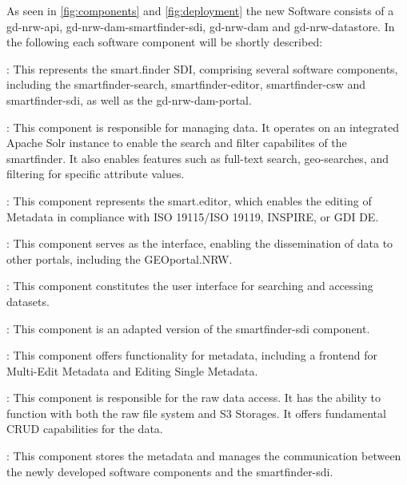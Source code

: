 \documentclass[11pt, titlepage, a4paper]{article}
\begin{document}
As seen in \ref{fig:components} and \ref{fig:deployment} the new Software consists of a gd-nrw-api, gd-nrw-dam-smartfinder-sdi, gd-nrw-dam and gd-nrw-datastore.
In the following each software component will be shortly described:
\begin{description}[]
    \item[gd-nrw-dam-smartfinder-sdi]: This represents the smart.finder SDI, comprising several software components, including the smartfinder-search, smartfinder-editor, smartfinder-csw and smartfinder-sdi, as well as the gd-nrw-dam-portal.
          \begin{description}[]
              \item[smartfinder-search]: This component is responsible for managing data. It operates on an integrated Apache Solr instance to enable the search and filter capabilites of the smartfinder. It also enables features such as full-text search, geo-searches, and filtering for specific attribute values.
              \item[smartfinder-editor]: This component represents the smart.editor, which enables the editing of Metadata in compliance with ISO 19115/ISO 19119, INSPIRE, or GDI DE.
              \item[smartfinder-csw]: This component serves as the  interface, enabling the dissemination of data to other portals, including the GEOportal.NRW.
              \item[smartfinder-sdi]: This component constitutes the user interface for searching and accessing datasets.
              \item[gd-nrw-dam-portal]: This component is an adapted version of the smartfinder-sdi component.
          \end{description}
    \item[gd-nrw-dam]: This component offers  functionality for metadata, including a frontend for Multi-Edit Metadata and Editing Single Metadata.
    \item[gd-nrw-datastore]: This component is responsible for the raw data access. It has the ability to function with both the raw file system and S3 Storages. It offers fundamental CRUD capabilities for the data.
    \item[gd-nrw-api]: This component stores the metadata and manages the communication between the newly developed software components and the smartfinder-sdi.
\end{description}
\end{document}
